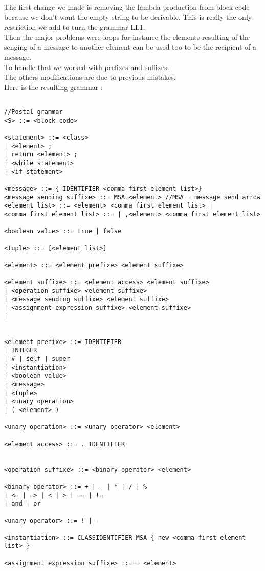 \documentclass{eplDoc}
\begin{document}
The first change we made is removing the lambda production from block code because we don't want the empty string to be derivable.  This is really the only restriction we add to turn the grammar LL1.
\\
Then the major problems were loops for instance the elements resulting of the senging of a message to another element can be used too to be the recipient of a message. \\
To handle that we worked with prefixes and suffixes.\\
The others modifications are due to previous mistakes.\\
Here is the resulting grammar : 
\begin{lstlisting}
    
//Postal grammar
<S> ::= <block code>

<statement> ::= <class>
| <element> ;
| return <element> ;
| <while statement>
| <if statement>

<message> ::= { IDENTIFIER <comma first element list>}
<message sending suffixe> ::= MSA <element> //MSA = message send arrow
<element list> ::= <element> <comma first element list> | 
<comma first element list> ::= | ,<element> <comma first element list>

<boolean value> ::= true | false

<tuple> ::= [<element list>]

<element> ::= <element prefixe> <element suffixe>

<element suffixe> ::= <element access> <element suffixe>
| <operation suffixe> <element suffixe>
| <message sending suffixe> <element suffixe>
| <assignment expression suffixe> <element suffixe>
| 


<element prefixe> ::= IDENTIFIER
| INTEGER
| # | self | super
| <instantiation>
| <boolean value>
| <message>
| <tuple>
| <unary operation>
| ( <element> )

<unary operation> ::= <unary operator> <element>

<element access> ::= . IDENTIFIER


<operation suffixe> ::= <binary operator> <element>

<binary operator> ::= + | - | * | / | % 
| <= | => | < | > | == | != 
| and | or

<unary operator> ::= ! | - 

<instantiation> ::= CLASSIDENTIFIER MSA { new <comma first element list> }

<assignment expression suffixe> ::= = <element>


\end{lstlisting}
\end{document}
